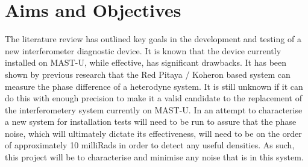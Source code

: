 \documentclass[12pt,a4paper,oneside]{report}
\begin{document}
	\chapter{Aims and Objectives}
The literature review has outlined key goals in the development and testing of a new interferometer diagnostic device. It is known that the device currently installed on MAST-U, while effective, has significant drawbacks. It has been shown by previous research \cite{Hickling2017InvestigationMAST-U} that the Red Pitaya / Koheron based system can measure the phase difference of a heterodyne system. It is still unknown if it can do this with enough precision to make it a valid candidate to the replacement of the interferometery system currently on MAST-U. In an attempt to characterise a new system for installation tests will need to be run to assure that the phase noise, which will ultimately dictate its effectiveness, will need to be on the order of approximately 10 milliRads in order to detect any useful densities. As such, this project will be to characterise and minimise any noise that is in this system. \\
\end{document}
